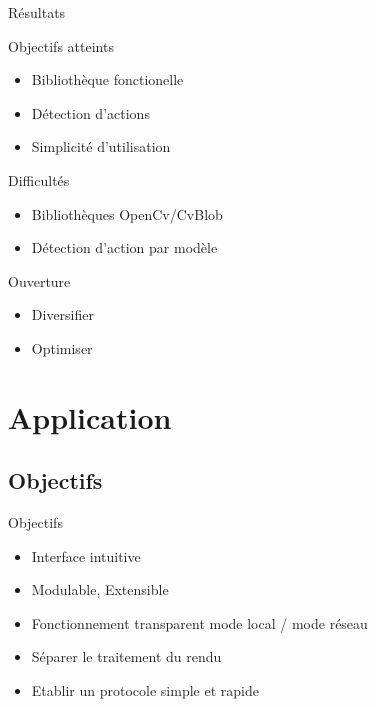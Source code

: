 \documentclass{beamer}
\begin{document}
            \begin{frame}{Résultats}
                  \begin{exampleblock}{Objectifs atteints}
                        \begin{itemize}
                        \item Bibliothèque fonctionelle
                        \item Détection d'actions
                        \item Simplicité d'utilisation
                        \end{itemize}
                  \end{exampleblock}
                  \pause
                  \begin{alertblock}{Difficultés}
                        \begin{itemize}
                        \item Bibliothèques OpenCv/CvBlob
                        \item Détection d'action par modèle
                        \end{itemize}
                  \end{alertblock}
                  \pause		  
                  \begin{block}{Ouverture}
			 \begin{itemize}
                        \item Diversifier
                        \item Optimiser
			\end{itemize}
                  \end{block}				  
            \end{frame}
      
	
	\section{Application}
	
		\subsection{Objectifs}
		\begin{frame}{Objectifs}
			\begin{itemize}
				\item Interface intuitive
				\item Modulable, Extensible
				\item Fonctionnement transparent mode local / mode réseau
				\item Séparer le traitement du rendu
				\item Etablir un protocole simple et rapide
			\end{itemize}
		\end{frame}
	
\end{document}
